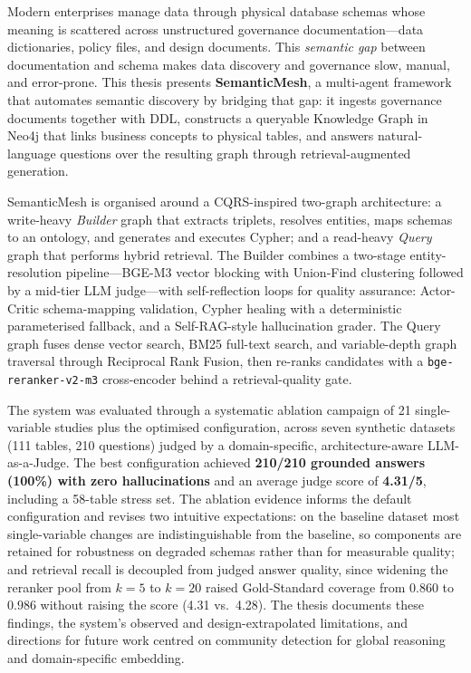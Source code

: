 
\begingroup
\setlength{\parindent}{0pt}
\setlength{\parskip}{\baselineskip}

Modern enterprises manage data through physical database schemas whose meaning is scattered across unstructured governance documentation---data dictionaries, policy files, and design documents. This \emph{semantic gap} between documentation and schema makes data discovery and governance slow, manual, and error-prone. This thesis presents \textbf{SemanticMesh}, a multi-agent framework that automates semantic discovery by bridging that gap: it ingests governance documents together with DDL, constructs a queryable Knowledge Graph in Neo4j that links business concepts to physical tables, and answers natural-language questions over the resulting graph through retrieval-augmented generation.

SemanticMesh is organised around a CQRS-inspired two-graph architecture: a write-heavy \emph{Builder} graph that extracts triplets, resolves entities, maps schemas to an ontology, and generates and executes Cypher; and a read-heavy \emph{Query} graph that performs hybrid retrieval. The Builder combines a two-stage entity-resolution pipeline---BGE-M3 vector blocking with Union-Find clustering followed by a mid-tier LLM judge---with self-reflection loops for quality assurance: Actor-Critic schema-mapping validation, Cypher healing with a deterministic parameterised fallback, and a Self-RAG-style hallucination grader. The Query graph fuses dense vector search, BM25 full-text search, and variable-depth graph traversal through Reciprocal Rank Fusion, then re-ranks candidates with a \texttt{bge-reranker-v2-m3} cross-encoder behind a retrieval-quality gate.

The system was evaluated through a systematic ablation campaign of 21 single-variable studies plus the optimised configuration, across seven synthetic datasets (111 tables, 210 questions) judged by a domain-specific, architecture-aware LLM-as-a-Judge. The best configuration achieved \textbf{210/210 grounded answers (100\%) with zero hallucinations} and an average judge score of \textbf{4.31/5}, including a 58-table stress set. The ablation evidence informs the default configuration and revises two intuitive expectations: on the baseline dataset most single-variable changes are indistinguishable from the baseline, so components are retained for robustness on degraded schemas rather than for measurable quality; and retrieval recall is decoupled from judged answer quality, since widening the reranker pool from $k{=}5$ to $k{=}20$ raised Gold-Standard coverage from $0.860$ to $0.986$ without raising the score (4.31 vs.\ 4.28). The thesis documents these findings, the system's observed and design-extrapolated limitations, and directions for future work centred on community detection for global reasoning and domain-specific embedding.

\endgroup
